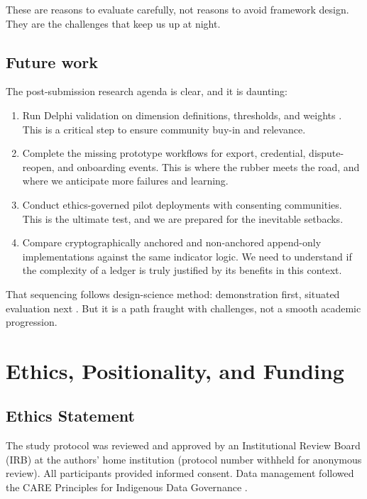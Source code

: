 \documentclass[sigconf,anonymous]{acmart}
\begin{document}
These are reasons to evaluate carefully, not reasons to avoid framework design. They are the challenges that keep us up at night.

\subsection{Future work}

The post-submission research agenda is clear, and it is daunting:

\begin{enumerate}
\item Run Delphi validation on dimension definitions, thresholds, and weights \cite{rowe1999}. This is a critical step to ensure community buy-in and relevance.
\item Complete the missing prototype workflows for export, credential, dispute-reopen, and onboarding events. This is where the rubber meets the road, and where we anticipate more failures and learning.
\item Conduct ethics-governed pilot deployments with consenting communities. This is the ultimate test, and we are prepared for the inevitable setbacks.
\item Compare cryptographically anchored and non-anchored append-only implementations against the same indicator logic. We need to understand if the complexity of a ledger is truly justified by its benefits in this context.
\end{enumerate}

That sequencing follows design-science method: demonstration first, situated evaluation next \cite{hevner2004, dresch2015}. But it is a path fraught with challenges, not a smooth academic progression.

\section{Ethics, Positionality, and Funding}

\subsection{Ethics Statement}

The study protocol was reviewed and approved by an Institutional Review Board (IRB) at the authors' home institution (protocol number withheld for anonymous review). All participants provided informed consent. Data management followed the CARE Principles for Indigenous Data Governance \cite{carroll2020}.
\end{document}
